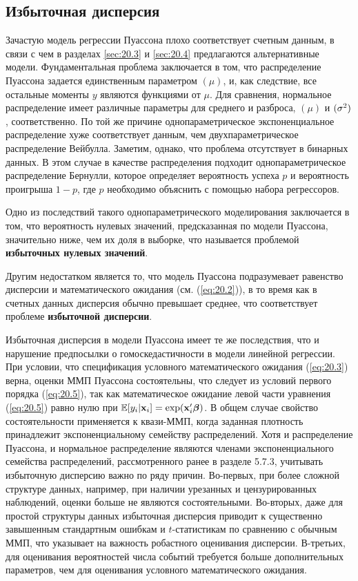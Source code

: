 \subsection{Избыточная дисперсия}\label{sec:20.2.4}

\noindent
Зачастую модель регрессии Пуассона плохо соответствует счетным данным, в связи с чем в разделах \ref{sec:20.3} и \ref{sec:20.4} предлагаются альтернативные модели. Фундаментальная проблема заключается в том, что распределение Пуассона задается единственным параметром $(\mu)$, и, как следствие, все остальные моменты $y$ являются функциями от $\mu$. Для сравнения, нормальное распределение имеет различные параметры для среднего и разброса, $(\mu)$ и $(\sigma^2)$, соответственно. По той же причине однопараметрическое экспоненциальное распределение хуже соответствует данным, чем двухпараметрическое распределение Вейбулла. Заметим, однако, что проблема отсутствует в бинарных данных. В этом случае в качестве распределения подходит однопараметрическое распределение Бернулли, которое определяет вероятность успеха $p$ и вероятность проигрыша $1 - p$, где $p$ необходимо объяснить с помощью набора регрессоров.

Одно из последствий такого однопараметрического моделирования заключается в том, что вероятность нулевых значений, предсказанная по модели Пуассона, значительно ниже, чем их доля в выборке, что называется проблемой \textbf{избыточных нулевых значений}.

Другим недостатком является то, что модель Пуассона подразумевает равенство дисперсии и математического ожидания (см. (\ref{eq:20.2})), в то время как в счетных данных дисперсия обычно превышает среднее, что соответствует проблеме \textbf{избыточной дисперсии}.

Избыточная дисперсия в модели Пуассона имеет те же последствия, что и нарушение предпосылки о гомоскедастичности в модели линейной регрессии. При условии, что спецификация условного математического ожидания (\ref{eq:20.3}) верна, оценки ММП Пуассона состоятельны, что следует из условий первого порядка (\ref{eq:20.5}), так как математическое ожидание левой части уравнения (\ref{eq:20.5}) равно нулю при $\mathbb{E}[y_i|\mathbf{x}_i] = \exp(\mathbf{x}_i'\bm{\beta})$. В общем случае свойство состоятельности применяется к квази-ММП, когда заданная плотность принадлежит экспоненциальному семейству распределений. Хотя и распределение Пуассона, и нормальное распределение являются членами экспоненциального семейства распределений, рассмотренного ранее в разделе 5.7.3, учитывать избыточную дисперсию важно по ряду причин. Во-первых, при более сложной структуре данных, например, при наличии урезанных и цензурированных наблюдений, оценки больше не являются состоятельными. Во-вторых, даже для простой структуры данных избыточная дисперсия приводит к существенно завышенным стандартным ошибкам и $t$-статистикам по сравнению с обычным ММП, что указывает на важность робастного оценивания дисперсии. В-третьих, для оценивания вероятностей числа событий требуется больше дополнительных параметров, чем для оценивания условного математического ожидания.

